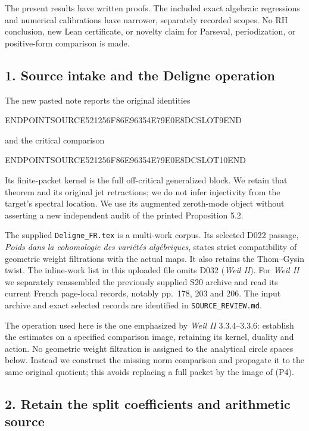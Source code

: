 The present results have written proofs. The included exact algebraic regressions and numerical calibrations have narrower, separately recorded scopes. No RH conclusion, new Lean certificate, or novelty claim for Parseval, periodization, or positive-form comparison is made.

\subsection{1. Source intake and the Deligne operation}\label{endpoint-periodized_original--source-intake-and-the-deligne-operation}

The new pasted note reports the original identities

ENDPOINTSOURCE521256F86E96354E79E0E8DCSLOT9END

and the critical comparison

ENDPOINTSOURCE521256F86E96354E79E0E8DCSLOT10END

Its finite-packet kernel is the full off-critical generalized block. We retain that theorem and its original jet retractions; we do not infer injectivity from the target's spectral location. We use its augmented zeroth-mode object without asserting a new independent audit of the printed Proposition 5.2.

The supplied \texttt{Deligne\_FR.tex} is a multi-work corpus. Its selected D022 passage, \emph{Poids dans la cohomologie des variétés algébriques}, states strict compatibility of geometric weight filtrations with the actual maps. It also retains the Thom--Gysin twist. The inline-work list in this uploaded file omits D032 (\emph{Weil II}). For \emph{Weil II} we separately reassembled the previously supplied S20 archive and read its current French page-local records, notably pp.~178, 203 and 206. The input archive and exact selected records are identified in \texttt{SOURCE\_REVIEW.md}.

The operation used here is the one emphasized by \emph{Weil II} 3.3.4--3.3.6: establish the estimates on a specified comparison image, retaining its kernel, duality and action. No geometric weight filtration is assigned to the analytical circle spaces below. Instead we construct the missing norm comparison and propagate it to the same original quotient; this avoids replacing a full packet by the image of (P4).

\subsection{2. Retain the split coefficients and arithmetic source}\label{endpoint-periodized_original--retain-the-split-coefficients-and-arithmetic-source}

